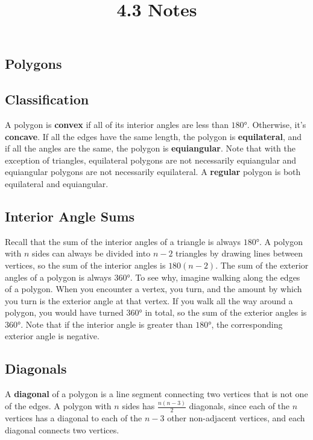 \documentclass{article}
\title{4.3 Notes}
\author{}
\date{}
\begin{document}
\maketitle

\begin{multicols}{2}
	\section*{Polygons}
	\subsection*{Classification}
	A polygon is \textbf{convex} if all of its interior angles are less than $\ang{180}$.
	Otherwise, it's \textbf{concave}.
	If all the edges have the same length, the polygon is \textbf{equilateral}, and if all the angles are the same, the polygon is \textbf{equiangular}.
	Note that with the exception of triangles, equilateral polygons are not necessarily equiangular and equiangular polygons are not necessarily equilateral.
	A \textbf{regular} polygon is both equilateral and equiangular.

	\subsection*{Interior Angle Sums}
	Recall that the sum of the interior angles of a triangle is always $\ang{180}$.
	A polygon with $n$ sides can always be divided into $n - 2$ triangles by drawing lines between vertices, so the sum of the interior angles is $180(n - 2)$.
	The sum of the exterior angles of a polygon is always $\ang{360}$.
	To see why, imagine walking along the edges of a polygon.
	When you encounter a vertex, you turn, and the amount by which you turn is the exterior angle at that vertex.
	If you walk all the way around a polygon, you would have turned $\ang{360}$ in total, so the sum of the exterior angles is $\ang{360}$.
	Note that if the interior angle is greater than $\ang{180}$, the corresponding exterior angle is negative.

	\subsection*{Diagonals}
	A \textbf{diagonal} of a polygon is a line segment connecting two vertices that is not one of the edges.
	A polygon with $n$ sides has $\frac{n(n - 3)}{2}$ diagonals, since each of the $n$ vertices has a diagonal to each of the $n - 3$ other non-adjacent vertices, and each diagonal connects two vertices.


\end{multicols}
\end{document}
